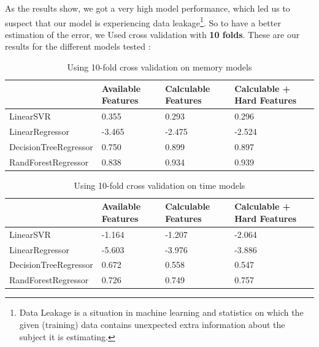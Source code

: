 As the results show, we got a very high model performance, which led us to suspect that our model is experiencing data leakage\footnote{Data Leakage\cite{9} is a situation in machine learning and statistics on which the given (training) data contains unexpected extra information about the subject it is estimating.}. So to have a better estimation of the error, we Used cross validation with \textbf{10 folds}. These are our results for the different models tested : 



\begin{table}[ht]
    \centering
    \begin{tabularx}{\textwidth}{| X |  X | X | X |}
        \hline
        & Available Features &  Calculable Features &  Calculable + Hard Features \\
		\hline
        LinearSVR              & 0.355       & 0.293        &   0.296     \\ \hline
        LinearRegressor        & -3.465      & -2.475       &   -2.524    \\ \hline
        DecisionTreeRegressor  & 0.750       & 0.899        &   0.897     \\ \hline
        RandForestRegressor    & 0.838       & 0.934        &   0.939     \\ \hline
    \end{tabularx}
    \caption{Using 10-fold cross validation on memory models}
\end{table}


\begin{table}[ht]
    \centering
    \begin{tabularx}{\textwidth}{| X |  X | X | X |}
        \hline
        & Available Features &  Calculable Features & Calculable + Hard Features \\
		\hline
        LinearSVR              & -1.164    & -1.207   &   -2.064  \\ \hline
        LinearRegressor        & -5.603    & -3.976   &  -3.886  \\ \hline
        DecisionTreeRegressor  & 0.672     & 0.558    &   0.547  \\ \hline
        RandForestRegressor    & 0.726     & 0.749    &   0.757  \\ \hline
    \end{tabularx}
    \caption{Using 10-fold cross validation on time models}
\end{table}


